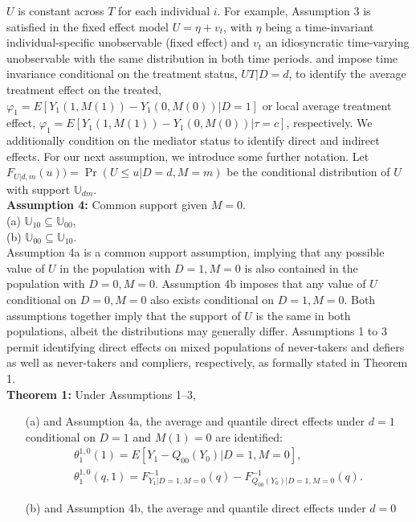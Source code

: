 \documentclass[a4paper,12pt]{article}
\begin{document}
 \doublespacing \pagestyle{plain}
$U$ is constant across $T$ for each individual $i$.  For example, Assumption 3 is satisfied in the fixed effect model $U = \eta + v_t$, with $\eta$ being a time-invariant individual-specific unobservable (fixed effect) and $v_t$ an idiosyncratic time-varying unobservable with the same distribution in both time periods.
 and  impose time invariance conditional on the treatment status, $U T|D=d$, to identify the average treatment effect on the treated, $\varphi_1=E[Y_1(1,M(1))-Y_1(0,M(0))|D=1]$ or local average treatment effect, $\varphi_1=E[Y_1(1,M(1))-Y_1(0,M(0))|\tau=c]$, respectively. We additionally condition on the mediator status to identify direct and indirect effects. %
For our next assumption, we introduce some further notation. Let $F_{U|d,m}(u) )= \Pr(U \leq u |D=d,M=m)$ be the conditional distribution of $U$ with support $\mathbb{U}_{dm}$. \\ %
\textbf{Assumption 4:} Common support given $M=0$.\\
(a) $\mathbb{U}_{10}\subseteq \mathbb{U}_{00}$,\\
(b) $\mathbb{U}_{00}\subseteq \mathbb{U}_{10}$.\vspace{5 pt}\\
Assumption 4a is a common support assumption, implying that any possible value of $U$ in the population with $D=1,M=0$ is also contained in the population with $D=0,M=0$. Assumption 4b imposes that any value of $U$ conditional on $D=0,M=0$ also exists conditional on $D=1,M=0$. Both assumptions together imply that the support of $U$ is the same in both populations, albeit the distributions may generally differ.
Assumptions 1 to 3 permit identifying direct effects on mixed populations of never-takers and defiers as well as never-takers and compliers, respectively, as formally stated in Theorem 1.\\
\noindent \textbf{Theorem 1:} Under Assumptions 1–3,
\begin{itemize}
\item[(a)] and Assumption 4a, the average and quantile direct effects under $d=1$ conditional on $D=1$ and $M(1)=0$ are identified:
\begin{align*}
\theta_1^{1,0}(1)= E[Y_1-Q_{00}(Y_0)|D=1,M=0], \\
\theta_1^{1,0}(q,1)= F_{Y_1|D=1,M=0}^{-1}(q)-F_{Q_{00}(Y_0)|D=1,M=0}^{-1}(q).
\end{align*}
\item[(b)] and Assumption 4b, the average and quantile direct effects under $d=0$
\end{itemize}
\end{document}
